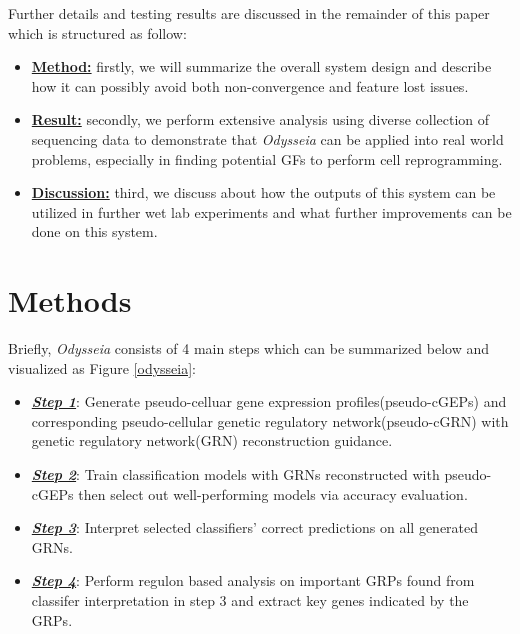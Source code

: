 \documentclass[fleqn,10pt]{wlscirep}
\begin{document}
Further details and testing results are discussed in the remainder of this paper which is structured as follow:
\begin{itemize}
\setlength\itemsep{0em}
\item{\hyperref[method]{\textbf{Method:}}}
    firstly, we will summarize the overall system design and describe how it can possibly avoid both non-convergence and feature lost issues.
\item {\hyperref[res]{\textbf{Result:}}}
    secondly, we perform extensive analysis using diverse collection of sequencing data to demonstrate that \emph{Odysseia} can be applied into real world problems, especially in finding potential GFs to perform cell reprogramming.
\item {\hyperref[disc]{\textbf{Discussion:}}}
    third, we discuss about how the outputs of this system can be utilized in further wet lab experiments and what further improvements can be done on this system.
\end{itemize}

\section*{Methods}
\label{method}
Briefly, \emph{Odysseia} consists of 4 main steps which can be summarized below and visualized as Figure \ref{odysseia}:
\begin{itemize}
  \item \hyperref[step1]{\textbf{\emph{Step 1}}}: Generate pseudo-celluar gene expression profiles(pseudo-cGEPs) and corresponding pseudo-cellular genetic regulatory network(pseudo-cGRN) with genetic regulatory network(GRN) reconstruction guidance.
  \item \hyperref[step2]{\textbf{\emph{Step 2}}}: Train classification models with GRNs reconstructed with pseudo-cGEPs then select out well-performing models via accuracy evaluation.
  \item \hyperref[step3]{\textbf{\emph{Step 3}}}: Interpret selected classifiers' correct predictions on all generated GRNs.
  \item \hyperref[step4]{\textbf{\emph{Step 4}}}: Perform regulon based analysis on important GRPs found from classifer interpretation in step 3 and extract key genes indicated by the GRPs.
\end{itemize}
\end{document}

